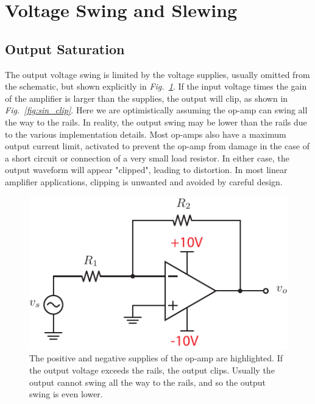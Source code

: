 \section{Voltage Swing and Slewing }
\subsection{Output Saturation}
The output voltage swing is limited by the voltage supplies, usually omitted from the schematic, but shown explicitly in \emph{Fig.~\ref{fig:opamp_invert_gain_supplies}}.  If the input voltage times the gain of the amplifier is larger than the supplies, the output will clip, as shown in \emph{Fig.~\ref{fig:sin_clip}}.  Here we are optimistically assuming the op-amp can swing all the way to the rails.  In reality, the output swing may be lower than the rails due to the various implementation details.  Most op-amps also have a maximum output current limit, activated to prevent the op-amp from damage in the case of a short circuit or connection of a very small load resistor.  In either case, the output waveform will appear "clipped", leading to distortion.  In most linear amplifier applications, clipping is unwanted and avoided by careful design.
\begin{figure}[tb]
\centering
\includegraphics[scale=1]{opamp_invert_gain_supplies}
\caption{The positive and negative supplies of the op-amp are highlighted.  If the output voltage exceeds the rails, the output clips.  Usually the output cannot swing all the way to the rails, and so the output swing is even lower.}
\label{fig:opamp_invert_gain_supplies}
\end{figure}
